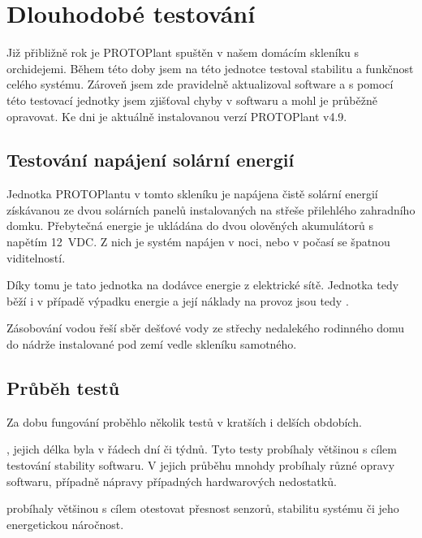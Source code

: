 \chapter{Dlouhodobé testování}
Již přibližně rok je PROTOPlant spuštěn v našem domácím skleníku s orchidejemi.
Během této doby jsem na této jednotce testoval stabilitu a funkčnost celého systému. 
Zároveň jsem zde pravidelně aktualizoval software a s pomocí této testovací jednotky jsem zjišťoval chyby v softwaru a mohl je průběžně opravovat.
Ke dni  je aktuálně instalovanou verzí PROTOPlant v4.9.

\section{Testování napájení solární energií}
Jednotka PROTOPlantu v tomto skleníku je napájena čistě solární energií získávanou ze dvou solárních panelů instalovaných na střeše přilehlého zahradního domku.
Přebytečná energie je ukládána do dvou olověných akumulátorů s napětím 12~VDC.
Z nich je systém napájen v noci, nebo v počasí se špatnou viditelností.

Díky tomu je tato jednotka  na dodávce energie z elektrické sítě.
Jednotka tedy běží i v případě výpadku energie a její náklady na provoz jsou tedy .

Zásobování vodou řeší sběr dešťové vody ze střechy nedalekého rodinného domu do nádrže instalované pod zemí vedle skleníku samotného.

\section{Průběh testů}
Za dobu fungování proběhlo několik testů v kratších i delších obdobích. \newline

\noindent{}, jejich délka byla v řádech dní či týdnů. 
Tyto testy probíhaly většinou s cílem testování stability softwaru.
V jejich průběhu mnohdy probíhaly různé opravy softwaru, případně nápravy případných hardwarových nedostatků. \newline

\noindent{} probíhaly většinou s cílem otestovat přesnost senzorů, stabilitu systému či jeho energetickou náročnost. 

\newpage